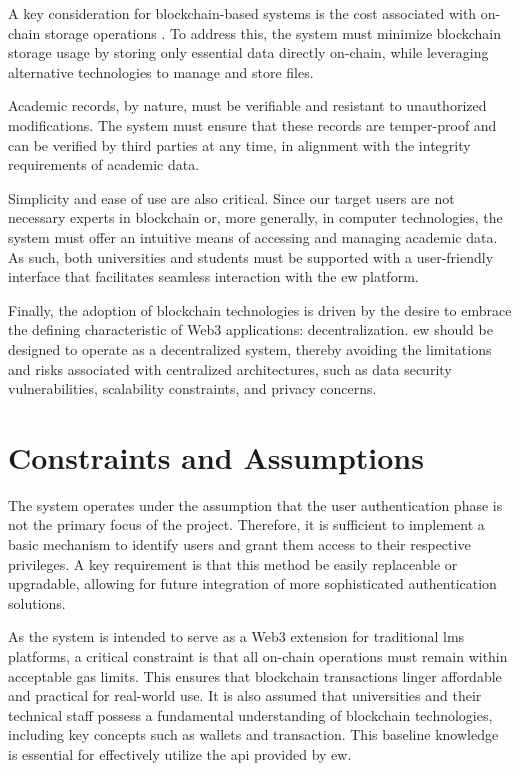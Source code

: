 A key consideration for blockchain-based systems is the cost associated with on-chain storage operations \cite{surya2024designdecentralizedidentity}. To address this, the system must minimize blockchain storage usage by storing only essential data directly on-chain, while leveraging alternative technologies to manage and store files.

Academic records, by nature, must be verifiable and resistant to unauthorized modifications. The system must ensure that these records are temper-proof and can be verified by third parties at any time, in alignment with the integrity requirements of academic data.

Simplicity and ease of use are also critical. Since our target users are not necessary experts in blockchain or, more generally, in computer technologies, the system must offer an intuitive means of accessing and managing academic data. As such, both universities and students must be supported with a user-friendly interface that facilitates seamless interaction with the \acrshort{ew} platform.

Finally, the adoption of blockchain technologies is driven by the desire to embrace the defining characteristic of Web3 applications: decentralization. \acrshort{ew} should be designed to operate as a decentralized system, thereby avoiding the limitations and risks associated with centralized architectures, such as data security vulnerabilities, scalability constraints, and privacy concerns. %



\section{Constraints and Assumptions}
The system operates under the assumption that the user authentication phase is not the primary focus of the project. Therefore, it is sufficient to implement a basic mechanism to identify users and grant them access to their respective privileges. A key requirement is that this method be easily replaceable or upgradable, allowing for future integration of more sophisticated authentication solutions.

As the system is intended to serve as a Web3 extension for traditional \acrshort{lms} platforms, a critical constraint is that all on-chain operations must remain within acceptable gas limits. This ensures that blockchain transactions linger affordable and practical for real-world use. It is also assumed that universities and their technical staff possess a fundamental understanding of blockchain technologies, including key concepts such as wallets and transaction. This baseline knowledge is essential for effectively utilize the \acrshort{api} provided by \acrshort{ew}.